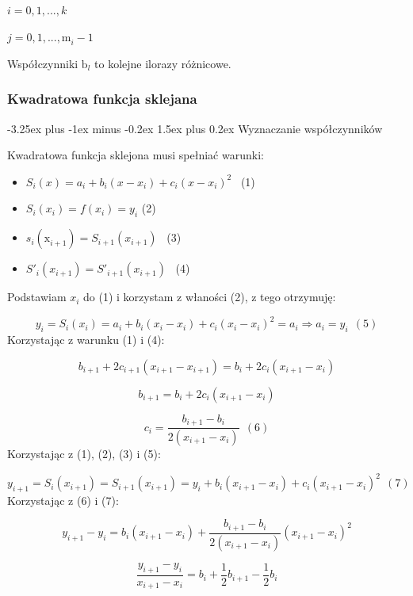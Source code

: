 \documentclass{article}
\makeatletter
\renewcommand{\paragraph}{\@startsection{paragraph}{4}{0ex}%
   {-3.25ex plus -1ex minus -0.2ex}%
   {1.5ex plus 0.2ex}%
   {\normalfont\normalsize\bfseries}}
\makeatother
\begin{document}
\indent

\(i = 0, 1, ..., k\)

\indent

\(j = 0,1,...,\mathrm{m}_{i}^{} - 1\)

\indent

Współczynniki \(\mathrm{b}_{l}^{}\) to kolejne ilorazy różnicowe.

\newpage

\subsubsection{Kwadratowa funkcja sklejana}

\paragraph{Wyznaczanie współczynników}

Kwadratowa funkcja sklejona musi spełniać warunki:

\begin{itemize}
    \item \( S_i (x) = a_i + b_i(x - x_i) + c_i(x - x_i)^2\) \ (1)
    \item \(S_i(x_i) = f(x_i) = y_i\) (2)
    \item \(s_i(\mathrm{x}_{i+1}^{}) = S_{i + 1}(x_{i+1})\) \ (3)
    \item \(S'_i(x_{i+1}) = S'_{i+1}(x_{i+1})\) \ (4)
\end{itemize}

\noindent
Podstawiam \(x_i\) do (1) i korzystam z właności (2), z tego otrzymuję:

\[y_i = S_i (x_i) = a_i + b_i(x_i - x_i) + c_i(x_i - x_i)^2 = a_i \Rightarrow  a_i = y_i \ \ (5)\] 
\noindent
Korzystając z warunku (1) i (4):

\[b_{i+1} + 2c_{i+1}(x_{i+1}-x_{i+1}) = b_i + 2c_i(x_{i+1} - x_i)\]

\[b_{i+1} = b_i + 2c_i(x_{i+1} - x_i)\]

\[c_i = \frac{b_{i+1}-b_i}{2(x_{i+1}-x_i)} \ \ (6)\] 
\noindent
Korzystając z (1), (2), (3) i (5):

\[y_{i+1} = S_i(x_{i+1}) = S_{i+1}(x_{i+1}) = y_i + b_i(x_{i+1} - x_i) + c_i(x_{i+1}-x_i)^2 \ \ (7)\]
\noindent
Korzystając z (6) i (7):

\[y_{i+1} - y_i = b_i(x_{i+1}-x_i) + \frac{b_{i+1}-b_i}{2(x_{i+1}-x_i)}(x_{i+1}-x_i)^2\]

\[\frac{y_{i+1} - y_i}{x_{i+1}-x_i} = b_i + \frac{1}{2}b_{i+1} - \frac{1}{2}b_i\]
\end{document}
